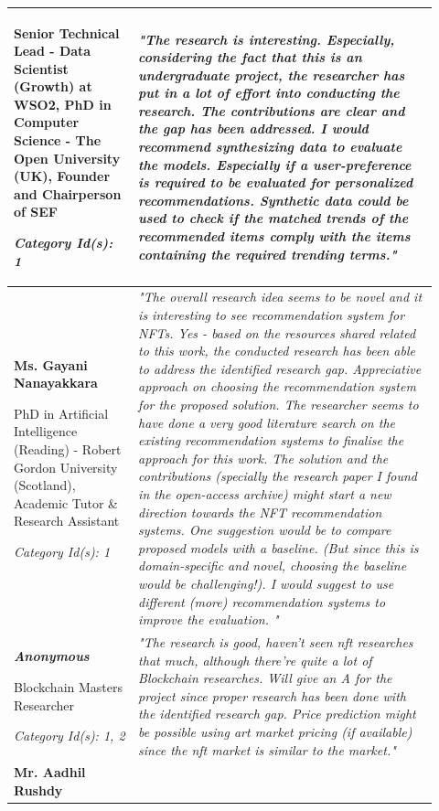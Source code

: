 \begin{longtable}{|p{0.27\linewidth}|p{0.655\linewidth}|}
Senior Technical Lead - Data Scientist (Growth) at WSO2, PhD in Computer Science - The Open University (UK), Founder and Chairperson of SEF

\textit{Category Id(s): 1}
& 
\textit{"The research is interesting. Especially, considering the fact that this is an undergraduate project, the researcher has put in a lot of effort into conducting the research. The contributions are clear and the gap has been addressed.
I would recommend synthesizing data to evaluate the models. Especially if a user-preference is required to be evaluated for personalized recommendations. Synthetic data could be used to check if the matched trends of the recommended items comply with the items containing the required trending terms."}
\\
\hline
\textbf{Ms. Gayani Nanayakkara}

PhD in Artificial Intelligence (Reading) - Robert Gordon University (Scotland), Academic Tutor \& Research Assistant

\textit{Category Id(s): 1}
& 
\textit{"The overall research idea seems to be novel and it is interesting to see recommendation system for NFTs.
Yes - based on the resources shared related to this work, the conducted research has been able to address the identified research gap.
Appreciative approach on choosing the recommendation system for the proposed solution. The researcher seems to have done a very good literature search on the existing recommendation systems to finalise the approach for this work.
The solution and the contributions (specially the research paper I found in the open-access archive) might start a new direction towards the NFT recommendation systems.
One suggestion would be to compare proposed models with a baseline. (But since this is domain-specific and novel, choosing the baseline would be challenging!).
I would suggest to use different (more) recommendation systems to improve the evaluation.
"}
\\
\hline
\textbf{\textit{Anonymous}}

Blockchain Masters Researcher 

\textit{Category Id(s): 1, 2}
& 
\textit{"The research is good, haven't seen \gls{nft} researches that much, although there're quite a lot of Blockchain researches. Will give an A for the project since proper research has been done with the identified research gap.
Price prediction might be possible using art market pricing (if available) since the \gls{nft} market is similar to the market."}
\\
\hline
\textbf{Mr. Aadhil Rushdy}


\end{longtable}
